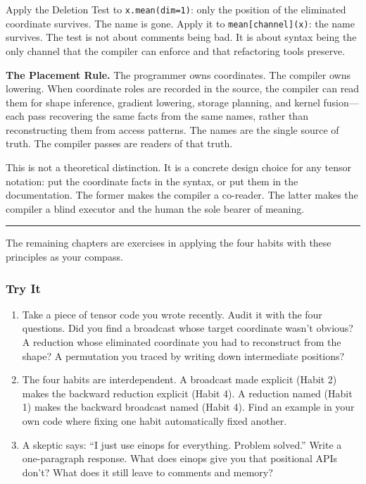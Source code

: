 \documentclass[11pt,]{article}
\begin{document}
Apply the Deletion Test to \texttt{x.mean(dim=1)}: only the position of
the eliminated coordinate survives. The name is gone. Apply it to
\texttt{mean{[}channel{]}(x)}: the name survives. The test is not about
comments being bad. It is about syntax being the only channel that the
compiler can enforce and that refactoring tools preserve.

\textbf{The Placement Rule.} The programmer owns coordinates. The
compiler owns lowering. When coordinate roles are recorded in the
source, the compiler can read them for shape inference, gradient
lowering, storage planning, and kernel fusion---each pass recovering the
same facts from the same names, rather than reconstructing them from
access patterns. The names are the single source of truth. The compiler
passes are readers of that truth.

This is not a theoretical distinction. It is a concrete design choice
for any tensor notation: put the coordinate facts in the syntax, or put
them in the documentation. The former makes the compiler a co-reader.
The latter makes the compiler a blind executor and the human the sole
bearer of meaning.

\begin{center}\rule{0.5\linewidth}{0.4pt}\end{center}

The remaining chapters are exercises in applying the four habits with
these principles as your compass.

\hypertarget{try-it-11}{%
\subsubsection{Try It}\label{try-it-11}}

\begin{enumerate}
\def\labelenumi{\arabic{enumi}.}
\item
  Take a piece of tensor code you wrote recently. Audit it with the four
  questions. Did you find a broadcast whose target coordinate wasn't
  obvious? A reduction whose eliminated coordinate you had to
  reconstruct from the shape? A permutation you traced by writing down
  intermediate positions?
\item
  The four habits are interdependent. A broadcast made explicit (Habit
  2) makes the backward reduction explicit (Habit 4). A reduction named
  (Habit 1) makes the backward broadcast named (Habit 4). Find an
  example in your own code where fixing one habit automatically fixed
  another.
\item
  A skeptic says: ``I just use einops for everything. Problem solved.''
  Write a one-paragraph response. What does einops give you that
  positional APIs don't? What does it still leave to comments and
  memory?
\end{enumerate}
\end{document}
